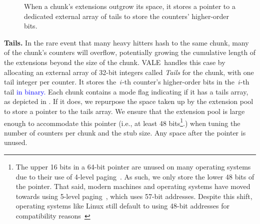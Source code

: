 \documentclass[sigconf]{acmart}
\newcommand{\counterencodingabbrv}{VALE}
\begin{document}
\begin{figure}
    \ifnoappendix
        \vspace{-2mm}
    \fi
    \caption{When a chunk's extensions outgrow its space, it stores a pointer
    to a dedicated external array of tails to store the counters' higher-order
    bits.}
    \ifnoappendix
        \vspace{-1mm}
    \fi
    \label{fig:counter_chunk_with_tails}
\end{figure}

\textbf{Tails.}
In the rare event that many heavy hitters hash to the same chunk, many of the
chunk's counters will overflow, potentially growing the cumulative length of
the extensions beyond the size of the chunk. \counterencodingabbrv\ handles
this case by allocating an external array of 32-bit integers called
\emph{Tails} for the chunk, with one tail integer per counter. It stores
the~$i${\nobreakdash-}th counter's higher-order bits in
the~$i${\nobreakdash-}th tail \textcolor{blue}{in binary.} Each chunk contains
a mode flag indicating if it has a tails array, as depicted in
.
If it does, we repurpose the space taken up by the extension pool to store a
pointer to the tails array. We ensure that the extension pool is large enough
to accommodate this pointer (i.e., at least 48 bits\footnote{The upper 16 bits
in a 64-bit pointer are unused on many operating systems due to their use of
4-level paging~\cite{Intel4LevelPaging}. As such, we only store the lower 48
bits of the pointer. That said, modern machines and operating systems have
moved towards using 5-level paging~\cite{Intel5LevelPaging}, which uses 57-bit
addresses. Despite this shift, operating systems like Linux still default to
using 48-bit addresses for compatibility reasons~\cite{Linux5LevelPaging}}.)
when tuning the number of counters per chunk and the stub size. Any space after
the pointer is unused. 
\end{document}
